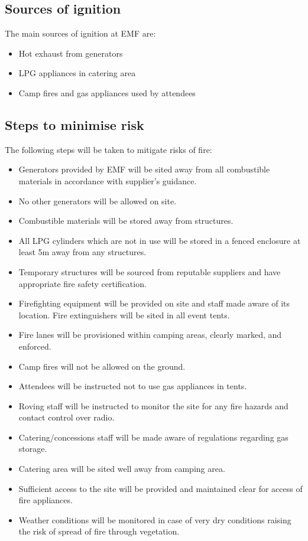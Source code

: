 \subsection{Sources of ignition}

The main sources of ignition at EMF are:

\begin{itemize}
\item Hot exhaust from generators
\item LPG appliances in catering area
\item Camp fires and gas appliances used by attendees
\end{itemize}

\subsection{Steps to minimise risk}
The following steps will be taken to mitigate risks of fire:

\begin{itemize}
\item Generators provided by EMF will be sited away from all combustible materials in accordance with supplier's guidance.
\item No other generators will be allowed on site.
\item Combustible materials will be stored away from structures.
\item All LPG cylinders which are not in use will be stored in a fenced enclosure at least 5m away from any structures.
\item Temporary structures will be sourced from reputable suppliers and have appropriate fire safety certification.
\item Firefighting equipment will be provided on site and staff made aware of its location. Fire extinguishers will be sited in all event tents.
\item Fire lanes will be provisioned within camping areas, clearly marked, and enforced.
\item Camp fires will not be allowed on the ground.
\item Attendees will be instructed not to use gas appliances in tents.
\item Roving staff will be instructed to monitor the site for any fire hazards and contact control over radio.
\item Catering/concessions staff will be made aware of regulations regarding gas storage.
\item Catering area will be sited well away from camping area.
\item Sufficient access to the site will be provided and maintained clear for access of fire appliances.
\item Weather conditions will be monitored in case of very dry conditions raising the risk of spread of fire through vegetation.
\end{itemize}

